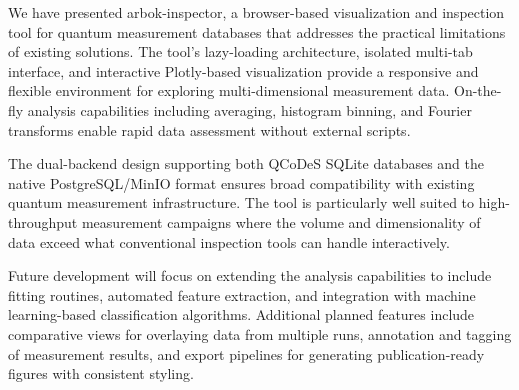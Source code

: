 We have presented arbok-inspector, a browser-based visualization and inspection tool for quantum measurement databases that addresses the practical limitations of existing solutions.
The tool's lazy-loading architecture, isolated multi-tab interface, and interactive Plotly-based visualization provide a responsive and flexible environment for exploring multi-dimensional measurement data.
On-the-fly analysis capabilities including averaging, histogram binning, and Fourier transforms enable rapid data assessment without external scripts.

The dual-backend design supporting both QCoDeS SQLite databases and the native PostgreSQL/MinIO format ensures broad compatibility with existing quantum measurement infrastructure.
The tool is particularly well suited to high-throughput measurement campaigns where the volume and dimensionality of data exceed what conventional inspection tools can handle interactively.

Future development will focus on extending the analysis capabilities to include fitting routines, automated feature extraction, and integration with machine learning-based classification algorithms.
Additional planned features include comparative views for overlaying data from multiple runs, annotation and tagging of measurement results, and export pipelines for generating publication-ready figures with consistent styling.
